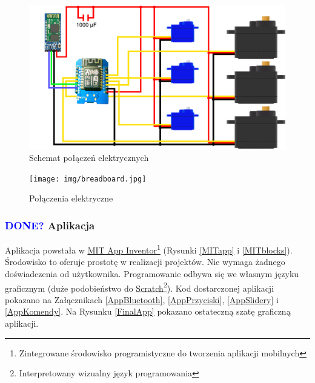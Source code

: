 \documentclass[11pt,titlepage,a4paper]{article}
\begin{document}
\vspace{4cm}

\begin{figure}[h!]
    \begin{center}
        \includegraphics[width=\textwidth]{img/schemat.png}
    \end{center}
    \caption{Schemat połączeń elektrycznych}
    \vspace{4cm}
    \label{SchematElektryczny}
\end{figure}

\begin{figure}[p]
    \begin{center}
        \texttt{[image: img/breadboard.jpg]}
    \end{center}
    \caption{Połączenia elektryczne}
    \label{Breadboard}
\end{figure}

\subsubsection{\textcolor{blue}{DONE?} Aplikacja}

Aplikacja powstała w \href{https://appinventor.mit.edu}{\underline{MIT App Inventor}}\footnote{Zintegrowane środowisko programistyczne do tworzenia aplikacji mobilnych} (Rysunki \ref{MITapp} i \ref{MITblocks}). Środowisko to oferuje prostotę w realizacji projektów. Nie wymaga żadnego doświadczenia od użytkownika. Programowanie odbywa się we własnym języku graficznym (duże podobieństwo do \href{https://scratch.mit.edu}{\underline{Scratch}}\footnote{Interpretowany wizualny język programowania}). Kod dostarczonej aplikacji pokazano na Załącznikach \ref{AppBluetooth}, \ref{AppPrzyciski}, \ref{AppSlidery} i \ref{AppKomendy}. Na Rysunku \ref{FinalApp} pokazano ostateczną szatę graficzną aplikacji.
\end{document}
